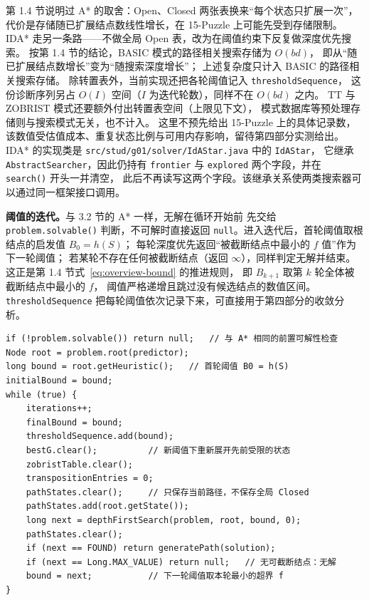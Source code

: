 第 1.4 节说明过 A* 的取舍：Open、Closed 两张表换来“每个状态只扩展一次”，
代价是存储随已扩展结点数线性增长，在 15-Puzzle 上可能先受到存储限制。
IDA* 走另一条路——不做全局 Open 表，改为在阈值约束下反复做深度优先搜索。
按第 1.4 节的结论，BASIC 模式的路径相关搜索存储为 $O(bd)$，
即从“随已扩展结点数增长”变为“随搜索深度增长”；
上述复杂度只计入 BASIC 的路径相关搜索存储。
除转置表外，当前实现还把各轮阈值记入 \texttt{thresholdSequence}，
这份诊断序列另占 $O(I)$ 空间（$I$ 为迭代轮数），同样不在 $O(bd)$ 之内。
TT 与 ZOBRIST 模式还要额外付出转置表空间（上限见下文），
模式数据库等预处理存储则与搜索模式无关，也不计入。
这里不预先给出 15-Puzzle 上的具体记录数，
该数值受估值成本、重复状态比例与可用内存影响，留待第四部分实测给出。
IDA* 的实现类是
\texttt{src/stud/g01/solver/IdAStar.java} 中的 \texttt{IdAStar}，
它继承 \texttt{AbstractSearcher}，因此仍持有 \texttt{frontier} 与
\texttt{explored} 两个字段，并在 \texttt{search()} 开头一并清空，
此后不再读写这两个字段。该继承关系使两类搜索器可以通过同一框架接口调用。

\textbf{阈值的迭代。}与 3.2 节的 A* 一样，无解在循环开始前
先交给 \texttt{problem.solvable()} 判断，不可解时直接返回 \texttt{null}。进入迭代后，首轮阈值取根结点的启发值 $B_0=h(S)$；
每轮深度优先返回“被截断结点中最小的 $f$ 值”作为下一轮阈值；
若某轮不存在任何被截断结点（返回 $\infty$），同样判定无解并结束。
这正是第 1.4 节式~\eqref{eq:overview-bound} 的推进规则，
即 $B_{k+1}$ 取第 $k$ 轮全体被截断结点中最小的 $f$，
阈值严格递增且跳过没有候选结点的数值区间。
\texttt{thresholdSequence} 把每轮阈值依次记录下来，可直接用于第四部分的收敛分析。

\par\noindent\begin{minipage}{\linewidth}
\par\vspace{2bp}
{\fontsize{9.5bp}{12bp}\selectfont
\noindent\begin{minipage}{\linewidth}
\begin{verbatim}
if (!problem.solvable()) return null;   // 与 A* 相同的前置可解性检查
Node root = problem.root(predictor);
long bound = root.getHeuristic();   // 首轮阈值 B0 = h(S)
initialBound = bound;
while (true) {
    iterations++;
    finalBound = bound;
    thresholdSequence.add(bound);
    bestG.clear();          // 新阈值下重新展开先前受限的状态
    zobristTable.clear();
    transpositionEntries = 0;
    pathStates.clear();     // 只保存当前路径，不保存全局 Closed
    pathStates.add(root.getState());
    long next = depthFirstSearch(problem, root, bound, 0);
    pathStates.clear();
    if (next == FOUND) return generatePath(solution);
    if (next == Long.MAX_VALUE) return null;   // 无可截断结点：无解
    bound = next;           // 下一轮阈值取本轮最小的超界 f
}
\end{verbatim}
\end{minipage}}
\end{minipage}\par

